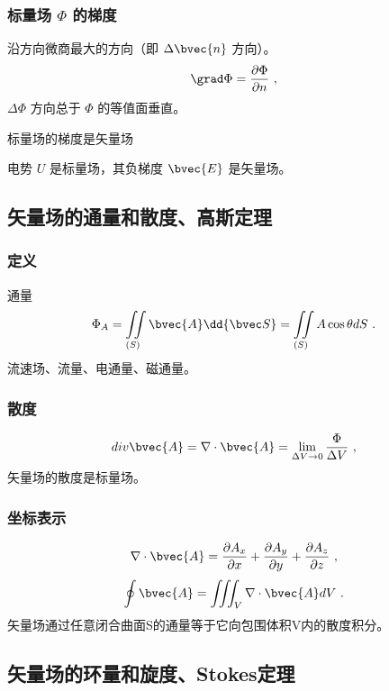 \subsubsection{标量场 $\Phi$ 的梯度}
沿方向微商最大的方向（即 $\Delta \bvec{n}$ 方向）。
\begin{equation}\label{eq_VecAnl_5}
\grad \Phi = \frac{\partial \Phi}{\partial n}~,
\end{equation}
$\Delta \Phi$ 方向总于 $\Phi$ 的等值面垂直。

标量场的梯度是矢量场

电势 $U$ 是标量场，其负梯度 $\bvec{E}$ 是矢量场。

\subsection{矢量场的通量和散度、高斯定理}%
\subsubsection{定义}
通量
\begin{equation}\label{eq_VecAnl_6}
\Phi_A=\iint\limits_{(S)} \bvec{A} \dd{\bvec S} = \iint\limits_{(S)} A\cos\theta dS~.
\end{equation}
流速场、流量、电通量、磁通量。

\subsubsection{散度}
\begin{equation}\label{eq_VecAnl_7}
div \bvec{A}=\nabla \cdot \bvec{A}=\lim_{\Delta V \to 0}\frac{\Phi}{\Delta V}~,
\end{equation}
矢量场的散度是标量场。

\subsubsection{坐标表示}
\begin{equation}\label{eq_VecAnl_8}
\nabla \cdot \bvec{A}= \frac{\partial A_x}{\partial x}+\frac{\partial A_y}{\partial y}+\frac{\partial A_z}{\partial z}~,
\end{equation}
\begin{equation}\label{eq_VecAnl_9}
\oint \bvec{A}=\iiint_V \nabla \cdot \bvec{A} dV~.
\end{equation}
矢量场通过任意闭合曲面S的通量等于它向包围体积V内的散度积分。
\subsection{矢量场的环量和旋度、Stokes定理}%

